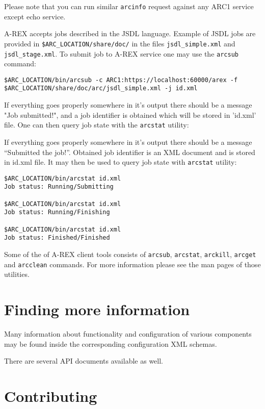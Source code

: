 \documentclass{article}                            %
\begin{document}
Please note that you can run similar \texttt{arcinfo} request against any ARC1
service except echo service.

A-REX accepts jobs described in the JSDL language. Example of JSDL jobs are
provided in \verb|$ARC_LOCATION/share/doc/| in the files \verb|jsdl_simple.xml|
and \verb|jsdl_stage.xml|. To submit job to A-REX service one may use the
\texttt{arcsub} command:

\begin{lstlisting}
$ARC_LOCATION/bin/arcsub -c ARC1:https://localhost:60000/arex -f $ARC_LOCATION/share/doc/arc/jsdl_simple.xml -j id.xml
\end{lstlisting}

If everything goes properly somewhere in it's output there should be a message
"Job submitted!", and a job identifier is obtained which will be stored
in 'id.xml' file. One can then query job state with the \texttt{arcstat} utility:

If everything goes properly somewhere in it's output there should be a message
``Submitted the job!''. Obtained job identifier is an XML document and is stored
in id.xml file. It may then be used to query job state with \texttt{arcstat}
utility:

\begin{lstlisting}
$ARC_LOCATION/bin/arcstat id.xml
Job status: Running/Submitting

$ARC_LOCATION/bin/arcstat id.xml
Job status: Running/Finishing

$ARC_LOCATION/bin/arcstat id.xml
Job status: Finished/Finished
\end{lstlisting}

Some of the of A-REX client tools consists of \texttt{arcsub}, \texttt{arcstat},
\texttt{arckill}, \texttt{arcget} and \texttt{arcclean} commands. For more
information please see the man pages of those utilities.

\section{Finding more information}
\label{sec:more-info}

Many information about functionality and configuration of various components
may be found inside the corresponding configuration XML schemas.

There are several API documents available as well.

\section{Contributing}
\label{sec:contributing}
\end{document}
